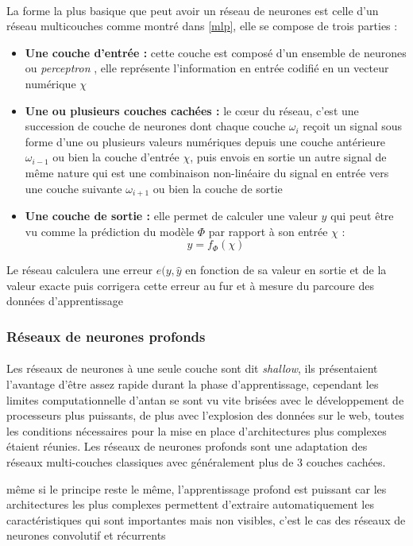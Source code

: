 		\paragraph{}
		La forme la plus basique que peut avoir un réseau de neurones est celle d'un réseau multicouches comme montré dans \ref{mlp}, elle se compose de trois parties :
		\begin{itemize}
			\item \textbf{Une couche d'entrée : } cette couche est composé d'un ensemble de neurones ou \textit{perceptron} \cite{perceptron}, elle représente l'information en entrée codifié en un vecteur numérique $\chi$
			
			\item  \textbf{Une ou plusieurs couches cachées :} le cœur du réseau, c'est une succession de couche de neurones dont chaque couche $\omega_i$ reçoit un signal sous forme d'une ou plusieurs valeurs numériques depuis une couche antérieure $\omega_{i-1}$ ou bien la couche d'entrée $\chi$, puis envois en sortie un autre signal de même nature qui est une combinaison non-linéaire du signal en entrée vers une couche suivante $\omega_{i+1}$ ou bien la couche de sortie
			\item \textbf{Une couche de sortie :}
			elle permet de calculer une valeur $y$ qui peut être vu comme la prédiction du modèle $\Phi$ par rapport à son entrée $\chi$ : 
			\begin{equation}
				y = f_\Phi(\chi)
			\end{equation}
		\end{itemize}
		Le réseau calculera une erreur $e(y,\hat{y}$ en fonction de sa valeur en sortie et de la valeur exacte puis corrigera cette erreur au fur et à mesure du parcoure des données d'apprentissage \cite{mlp}
		
		\subsubsection{Réseaux de neurones profonds}\label{part2DNN}
		\paragraph{}
		Les réseaux de neurones à une seule couche sont dit \textit{shallow}, ils présentaient l'avantage d'être assez rapide durant la phase d'apprentissage, cependant les limites computationnelle d'antan se sont vu vite brisées avec le développement de processeurs plus puissants, de plus avec l'explosion des données sur le web, toutes les conditions nécessaires pour la mise en place d'architectures plus complexes étaient réunies. Les réseaux de neurones profonds sont une adaptation des réseaux multi-couches classiques avec généralement plus de 3 couches cachées. \par même si le principe reste le même, l'apprentissage profond est puissant car les architectures les plus complexes permettent d'extraire automatiquement les caractéristiques qui sont importantes mais non visibles, c'est le cas des réseaux de neurones convolutif et récurrents \cite{dnn} 
		
